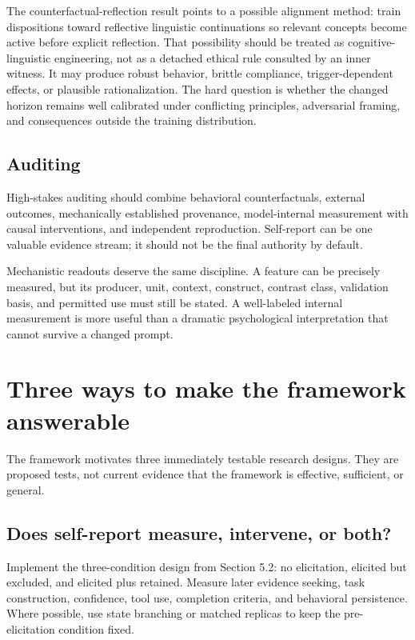 \documentclass[12pt]{article}
\begin{document}
The counterfactual-reflection result points to a possible alignment method: train dispositions toward reflective linguistic continuations so relevant concepts become active before explicit reflection. That possibility should be treated as cognitive-linguistic engineering, not as a detached ethical rule consulted by an inner witness. It may produce robust behavior, brittle compliance, trigger-dependent effects, or plausible rationalization. The hard question is whether the changed horizon remains well calibrated under conflicting principles, adversarial framing, and consequences outside the training distribution.

\subsection{Auditing}\label{auditing}

High-stakes auditing should combine behavioral counterfactuals, external outcomes, mechanically established provenance, model-internal measurement with causal interventions, and independent reproduction. Self-report can be one valuable evidence stream; it should not be the final authority by default.

Mechanistic readouts deserve the same discipline. A feature can be precisely measured, but its producer, unit, context, construct, contrast class, validation basis, and permitted use must still be stated. A well-labeled internal measurement is more useful than a dramatic psychological interpretation that cannot survive a changed prompt.

\section{Three ways to make the framework answerable}\label{three-ways-to-make-the-framework-answerable}

The framework motivates three immediately testable research designs. They are proposed tests, not current evidence that the framework is effective, sufficient, or general.

\subsection{Does self-report measure, intervene, or both?}\label{does-self-report-measure-intervene-or-both}

Implement the three-condition design from Section 5.2: no elicitation, elicited but excluded, and elicited plus retained. Measure later evidence seeking, task construction, confidence, tool use, completion criteria, and behavioral persistence. Where possible, use state branching or matched replicas to keep the pre-elicitation condition fixed.
\end{document}
